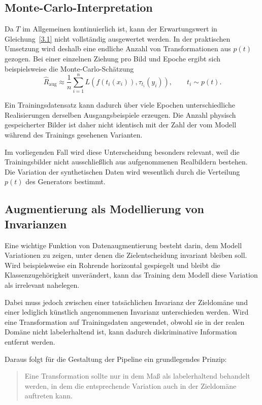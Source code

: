 \subsection{Monte-Carlo-Interpretation}

Da $T$ im Allgemeinen kontinuierlich ist, kann der Erwartungswert in Gleichung~\eqref{3.1} nicht vollständig ausgewertet werden. In der praktischen Umsetzung wird deshalb eine endliche Anzahl von Transformationen aus $p(t)$ gezogen. Bei einer einzelnen Ziehung pro Bild und Epoche ergibt sich beispielsweise die Monte-Carlo-Schätzung
\begin{equation}
\hat R_{\mathrm{aug}}
\approx
\frac{1}{n}
\sum_{i=1}^{n}
L\left(
f(t_i(x_i)),
\tau_{t_i}(y_i)
\right),
\qquad t_i\sim p(t).
\tag{3.3}
\end{equation}

Ein Trainingsdatensatz kann dadurch über viele Epochen unterschiedliche Realisierungen derselben Ausgangsbeispiele erzeugen. Die Anzahl physisch gespeicherter Bilder ist daher nicht identisch mit der Zahl der vom Modell während des Trainings gesehenen Varianten.

Im vorliegenden Fall wird diese Unterscheidung besonders relevant, weil die Trainingsbilder nicht ausschließlich aus aufgenommenen Realbildern bestehen. Die Variation der synthetischen Daten wird wesentlich durch die Verteilung $p(t)$ des Generators bestimmt.

\subsection{Augmentierung als Modellierung von Invarianzen}

Eine wichtige Funktion von Datenaugmentierung besteht darin, dem Modell Variationen zu zeigen, unter denen die Zielentscheidung invariant bleiben soll. Wird beispielsweise ein Rohrende horizontal gespiegelt und bleibt die Klassenzugehörigkeit unverändert, kann das Training dem Modell diese Variation als irrelevant nahelegen.

Dabei muss jedoch zwischen einer tatsächlichen Invarianz der Zieldomäne und einer lediglich künstlich angenommenen Invarianz unterschieden werden. Wird eine Transformation auf Trainingsdaten angewendet, obwohl sie in der realen Domäne nicht labelerhaltend ist, kann dadurch diskriminative Information entfernt werden.

Daraus folgt für die Gestaltung der Pipeline ein grundlegendes Prinzip:

\begin{quote}
Eine Transformation sollte nur in dem Maß als labelerhaltend behandelt werden, in dem die entsprechende Variation auch in der Zieldomäne auftreten kann.
\end{quote}

